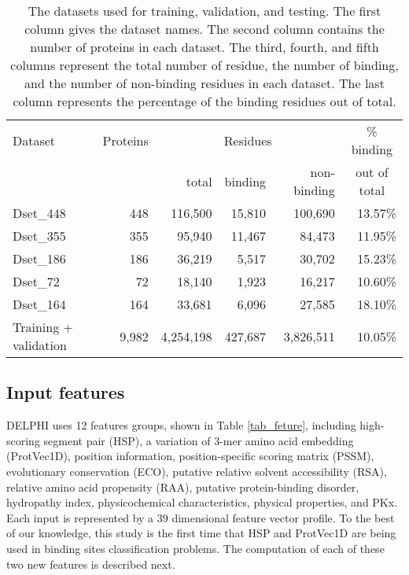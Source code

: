 \documentclass{bioinfo}
\begin{document}
\begin{methods}
\begin{table*}[htbp]
    \centering
    \caption{The datasets used for training, validation, and testing. The first column gives the dataset names. The second column contains the number of proteins in each dataset. The third, fourth, and fifth columns represent the total number of residue, the number of binding, and the number of non-binding residues in each dataset. The last column represents the percentage of the binding residues out of total.}
    \begin{tabular}{p{12em}rrrrr}
    \toprule
    Dataset & Proteins & \multicolumn{3}{c}{Residues} & \multicolumn{1}{c}{\% binding} \\ \cline{3-5}
    & & total & binding & non-binding & \multicolumn{1}{c}{out of total}\\ \hline
    Dset\_448 & 448   & 116,500 & 15,810 & 100,690 & 13.57\% \\
    Dset\_355 & 355   & 95,940 & 11,467 & 84,473 & 11.95\% \\
    Dset\_186 & 186   & 36,219 & 5,517 & 30,702 & 15.23\% \\
    Dset\_72 & 72    & 18,140 & 1,923 & 16,217 & 10.60\% \\
    Dset\_164 & 164   & 33,681 & 6,096 & 27,585 & 18.10\% \\
    Training + validation & 9,982 & 4,254,198 & 427,687 & 3,826,511 & 10.05\% \\
    \hline
    \end{tabular}%
    \label{tab_dataset}%
\end{table*}%

\subsection{Input features}
DELPHI uses 12 features groups, shown in Table \ref{tab_feture}, including high-scoring segment pair (HSP), a variation of 3-mer amino acid embedding (ProtVec1D), position information, position-specific scoring matrix (PSSM), evolutionary conservation (ECO), putative relative solvent accessibility (RSA), relative amino acid propensity (RAA), putative protein-binding disorder, hydropathy index, physicochemical characteristics, physical properties, and PKx. Each input is represented by a 39 dimensional feature vector profile. To the best of our knowledge, this study is the first time that HSP and ProtVec1D are being used in binding sites classification problems. The computation of each of these two new features is described next.


\end{methods}
\end{document}
